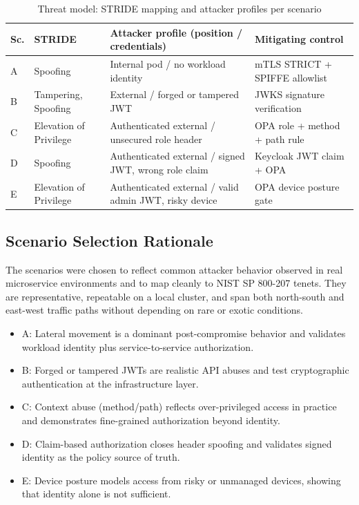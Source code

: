 \documentclass[conference]{IEEEtran}
\begin{document}
\begin{table}[!t]
\caption{Threat model: STRIDE mapping and attacker profiles per scenario}
\label{tab:stride}
\centering
\scriptsize
\begin{tabularx}{\columnwidth}{l l >{\raggedright\arraybackslash}X >{\raggedright\arraybackslash}X}
\toprule
Sc. & STRIDE & Attacker profile (position / credentials) & Mitigating control \\
\midrule
A & Spoofing & Internal pod / no workload identity & mTLS STRICT + SPIFFE allowlist \\
B & Tampering, Spoofing & External / forged or tampered JWT & JWKS signature verification \\
C & Elevation of Privilege & Authenticated external / unsecured role header & OPA role + method + path rule \\
D & Spoofing & Authenticated external / signed JWT, wrong role claim & Keycloak JWT claim + OPA \\
E & Elevation of Privilege & Authenticated external / valid admin JWT, risky device & OPA device posture gate \\
\bottomrule
\end{tabularx}
\end{table}

\subsection{Scenario Selection Rationale}
The scenarios were chosen to reflect common attacker behavior observed in real
microservice environments and to map cleanly to NIST SP 800-207 tenets. They are
representative, repeatable on a local cluster, and span both north-south and east-west
traffic paths without depending on rare or exotic conditions.
\begin{itemize}[noitemsep, topsep=3pt, parsep=0pt, partopsep=0pt]
  \item A: Lateral movement is a dominant post-compromise behavior and validates
  workload identity plus service-to-service authorization.
  \item B: Forged or tampered JWTs are realistic API abuses and test cryptographic
  authentication at the infrastructure layer.
  \item C: Context abuse (method/path) reflects over-privileged access in practice
  and demonstrates fine-grained authorization beyond identity.
  \item D: Claim-based authorization closes header spoofing and validates signed
  identity as the policy source of truth.
  \item E: Device posture models access from risky or unmanaged devices, showing that
  identity alone is not sufficient.
\end{itemize}
\end{document}
